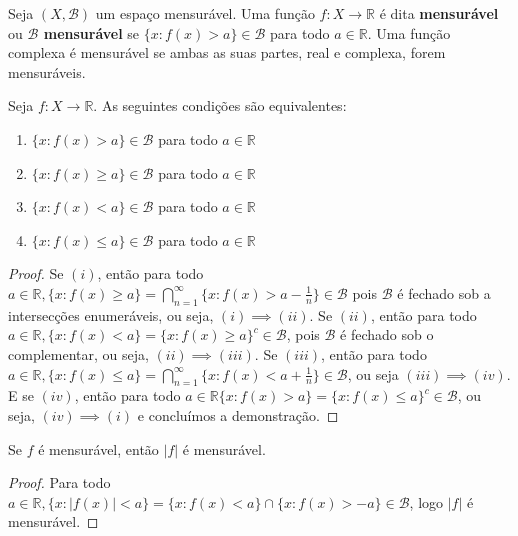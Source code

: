 \begin{definicao}
    Seja $(X,\mathcal{B})$ um espaço mensurável. Uma função $f: X \to \mathbb{R}$ é dita \textbf{mensurável} ou \textbf{$\mathcal{B}$ mensurável} se $\{x: f(x) > a \} \in \mathcal{B}$ para todo $a \in \mathbb{R}$. Uma função complexa é mensurável se ambas as suas partes, real e complexa, forem mensuráveis. 
\end{definicao}

\begin{proposicao} \label{prop4.1}
    Seja $f: X \to \mathbb{R}$. As seguintes condições são equivalentes: 
    \begin{enumerate}[label=(\roman*)]
        \item $\{x: f(x) > a \} \in \mathcal{B}$ para todo $a \in \mathbb{R}$
        \item $\{x: f(x) \geq a \} \in \mathcal{B}$ para todo $a \in \mathbb{R}$
        \item $\{x: f(x) < a \} \in \mathcal{B}$ para todo $a \in \mathbb{R}$
        \item $\{x: f(x) \leq a \} \in \mathcal{B}$ para todo $a \in \mathbb{R}$
    \end{enumerate}
    \begin{proof}
        Se $(i)$, então para todo $a \in \mathbb{R}, \{x : f(x)\geq a \} = \bigcap_{n=1}^\infty \{x : f(x)> a - \frac{1}{n}\} \in \mathcal{B}$ pois $\mathcal{B}$ é fechado sob a intersecções enumeráveis, ou seja, $(i) \implies (ii)$. Se $(ii)$, então para todo $a \in \mathbb{R}, \{x: f(x) < a\} = \{x: f(x) \geq a\}^c \in \mathcal{B}$, pois $\mathcal{B}$ é fechado sob o complementar, ou seja, $(ii) \implies (iii)$. Se $(iii)$, então para todo $a \in \mathbb{R}, \{x: f(x) \leq a\} = \bigcap_{n=1}^\infty \{x : f(x) < a + \frac{1}{n}\} \in \mathcal{B}$, ou seja $(iii) \implies (iv)$. E se $(iv)$, então para todo $a \in \mathbb{R} \{x : f(x) > a \} =  \{x : f(x) \leq a \}^c \in \mathcal{B}$, ou seja, $(iv) \implies (i)$ e concluímos a demonstração.
    \end{proof}
\end{proposicao}

\begin{proposicao}
    Se $f$ é mensurável, então $|f|$ é mensurável.
    \begin{proof}
        Para todo $a \in \mathbb{R}, \{ x : |f(x)| < a \} = \{ x : f(x) < a \} \cap \{ x : f(x) > -a \} \in \mathcal{B}$, logo $|f|$ é mensurável.
    \end{proof}
\end{proposicao}

